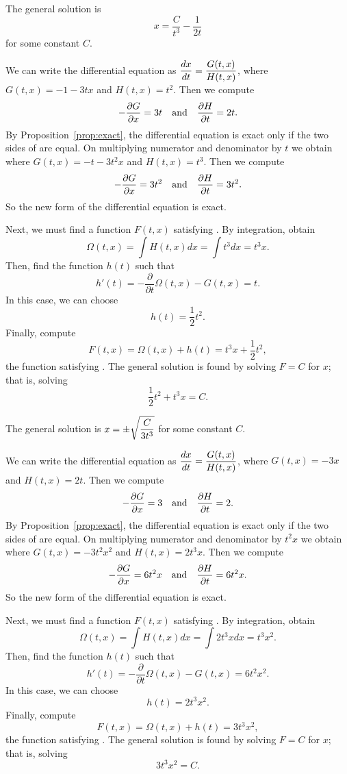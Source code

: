  \ans The general solution is 
\[ x = \frac{C}{t^3} - \frac{1}{2t} \] 
for some constant $C$.

\soln We can write the differential equation as $\displaystyle\frac{dx}{dt} =
\frac{G(t,x)}{H(t,x)}$, where $G(t,x) = -1-3tx$ and $H(t,x) = t^2$. 
Then we compute
\[
-\frac{\partial G}{\partial x} = 3t \quad\mbox{and}\quad
\frac{\partial H}{\partial t} = 2t.
\]
By Proposition~\ref{prop:exact}, the
differential equation is exact only if the two sides of  are
equal.
On multiplying numerator and denominator by $t$ we obtain
where $G(t,x) = -t-3t^2x$ and $H(t,x) = t^3$. 
Then we compute
\[
-\frac{\partial G}{\partial x} = 3t^2 \quad\mbox{and}\quad
\frac{\partial H}{\partial t} = 3t^2.
\]
So the new form of the differential equation is exact.

Next, we must find a function $F(t,x)$ satisfying .
By integration, obtain
\[
\Omega(t,x) = \int H(t,x)dx = \int t^3dx = t^3x.
\]
Then, find the function $h(t)$ such that
\[
h'(t) = -\frac{\partial}{\partial t}\Omega(t,x) - G(t,x)
= t.
\]
In this case, we can choose 
\[
h(t) =  \frac{1}{2}t^2.  
\]
Finally, compute
\[
F(t,x) = \Omega(t,x) + h(t) = t^3x + \frac{1}{2}t^2,
\]
the function satisfying .  The general solution is found by 
solving $F=C$ for $x$; that is, solving
\[
\frac{1}{2}t^2 + t^3x = C.
\]

 \ans The general solution is $x = \displaystyle\pm\sqrt{\frac{C}{3t^3}}$ 
for some constant $C$.

\soln We can write the differential equation as $\displaystyle\frac{dx}{dt} =
\frac{G(t,x)}{H(t,x)}$, where $G(t,x) = -3x$ and $H(t,x) = 2t$. 
Then we compute
\[
-\frac{\partial G}{\partial x} = 3 \quad\mbox{and}\quad
\frac{\partial H}{\partial t} = 2.
\]
By Proposition~\ref{prop:exact}, the differential equation is exact only
if the two sides of  are equal.
On multiplying numerator and denominator by $t^2x$ we obtain
where $G(t,x) = -3t^2x^2$ and $H(t,x) = 2t^3x$. 
Then we compute
\[
-\frac{\partial G}{\partial x} = 6t^2x \quad\mbox{and}\quad
\frac{\partial H}{\partial t} = 6t^2x.
\]
So the new form of the differential equation is exact.

Next, we must find a function $F(t,x)$ satisfying .  By
integration, obtain
\[
\Omega(t,x) = \int H(t,x)dx = \int 2t^3xdx = t^3x^2.
\]
Then, find the function $h(t)$ such that
\[
h'(t) = -\frac{\partial}{\partial t}\Omega(t,x) - G(t,x)
= 6t^2x^2.
\]
In this case, we can choose 
\[
h(t) =  2t^3x^2.  
\]
Finally, compute
\[
F(t,x) = \Omega(t,x) + h(t) = 3t^3x^2,
\]
the function satisfying .  The general solution is found by 
solving $F=C$ for $x$; that is, solving
\[
3t^3x^2 = C.
\]

